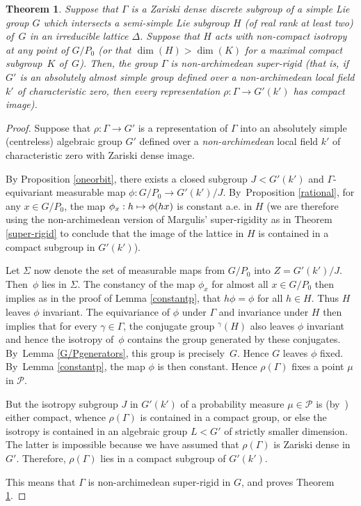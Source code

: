 \documentclass[JEP,XML,SOM,Unicode,published]{cedram}
\def\mto{\mathchoice{\longmapsto}{\mapsto}{\mapsto}{\mapsto}}
\newtheorem{theorem}{Theorem}
\theoremstyle{definition}
\let\g\gamma
\let\G\Gamma
\begin{document}
\begin{theorem}\label{nonarch} Suppose that $\Gamma $ is a Zariski dense discrete subgroup of a simple Lie group $G$ which intersects a semi-simple Lie subgroup $H$ (of real rank at least two) of~$G$ in an
irreducible lattice $\Delta$. Suppose that $H$ acts with non-compact isotropy at any point of $G/P_0$ {\rm(}or that $\dim (H)>\dim(K)$ for a maximal compact subgroup~$K$ of~$G$). Then, the group $\Gamma $ is
non-archimedean super-rigid (that is, if $G'$ is an absolutely almost simple group defined over a non-archimedean local field $k'$ of characteristic zero, then every representation $\rho : \G \to G'(k')$ has compact image{\rm)}.
\end{theorem}

\begin{proof} Suppose that $\rho :\Gamma \to G'$ is a representation of $\Gamma $ into an absolutely simple (centreless) algebraic group $G'$ defined over a \emph{non-archimedean} local field $k'$ of characteristic zero with Zariski dense image.

By Proposition \ref{oneorbit}, there exists a closed subgroup $J< G'(k')$ and $\G$-equivariant measurable map $\phi : G/P_0\to G'(k')/J$. By~Proposition \ref{rational}, for any $x\in G/P_0$, the map $\phi_x: h\mto \phi(hx)$ is constant a.e. in $H$ (we are therefore using the non-archimedean version of Margulis' super-rigidity as in Theorem \ref{super-rigid} to conclude that the
image of the lattice in $H$ is contained in a compact subgroup in $G'(k')$).

Let $\Sigma $ now denote the set of measurable maps from $G/P_0$ into $Z=G'(k')/J$. Then~$\phi $ lies in $\Sigma$. The constancy of the map $\phi_x$ for almost all $x\in G/P_0$ then implies as in the proof of Lemma \ref{constantp}, that $h\phi =\phi$ for all $h\in H$. Thus $H$ leaves $\phi $ invariant. The equivariance of $\phi $ under $\G$ and invariance under $H$ then implies that for every $\g \in \G$, the conjugate group $^{\g} (H)$ also leaves $\phi $ invariant and hence the isotropy of~$\phi$ contains the group generated by these conjugates. By~Lemma \ref{G/Pgenerators}, this group is precisely~$G$. Hence $G$ leaves $\phi $ fixed. By~Lemma \ref{constantp}, the map $\phi $ is then constant. Hence $\rho (\Gamma)$ fixes a point $\mu $ in ${\mathcal P}$.

But the isotropy subgroup $J$ in $G'(k')$ of a probability measure $\mu\in {\mathcal P}$ is (by~\cite[Cor.\,(3.2.19)]{Z})
either compact, whence $\rho (\G)$ is contained in a compact group, or else the isotropy is contained in an algebraic group $L < G'$ of strictly smaller dimension. The latter is impossible because we have assumed that $\rho (\G)$ is Zariski dense in $G'$. Therefore, $\rho (\G)$ lies in a compact subgroup of $G'(k')$.

This means that $\Gamma $ is non-archimedean super-rigid in $G$, and proves Theorem \ref{nonarch}.
\end{proof}
\end{document}
